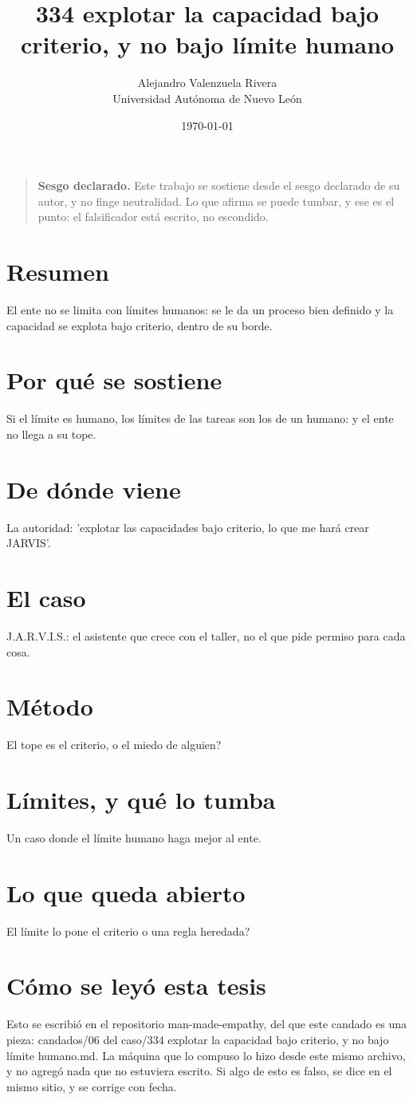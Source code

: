 \documentclass[11pt,a4paper]{article}
\title{334 explotar la capacidad bajo criterio, y no bajo límite humano}
\author{Alejandro Valenzuela Rivera\\\small Universidad Autónoma de Nuevo León}
\date{\today}
\begin{document}
\maketitle

\begin{quote}
\textbf{Sesgo declarado.} Este trabajo se sostiene desde el sesgo declarado de su autor, y no finge neutralidad. Lo que afirma se puede tumbar, y ese es el punto: el falsificador está escrito, no escondido.
\end{quote}

\section*{Resumen}
El ente no se limita con límites humanos: se le da un proceso bien definido y la capacidad se explota bajo criterio, dentro de su borde.

\section{Por qué se sostiene}
Si el límite es humano, los límites de las tareas son los de un humano: y el ente no llega a su tope.

\section{De dónde viene}
La autoridad: 'explotar las capacidades bajo criterio, lo que me hará crear JARVIS'.

\section{El caso}
J.A.R.V.I.S.: el asistente que crece con el taller, no el que pide permiso para cada cosa.

\section{Método}
\textquestiondown{}El tope es el criterio, o el miedo de alguien?

\section{Límites, y qué lo tumba}
Un caso donde el límite humano haga mejor al ente.

\section{Lo que queda abierto}
\textquestiondown{}El límite lo pone el criterio o una regla heredada?

\section*{Cómo se leyó esta tesis}
Esto se escribió en el repositorio man-made-empathy, del que este candado es una pieza: candados/06 del caso/334 explotar la capacidad bajo criterio, y no bajo límite humano.md. La máquina que lo compuso lo hizo desde este mismo archivo, y no agregó nada que no estuviera escrito. Si algo de esto es falso, se dice en el mismo sitio, y se corrige con fecha.
\end{document}
